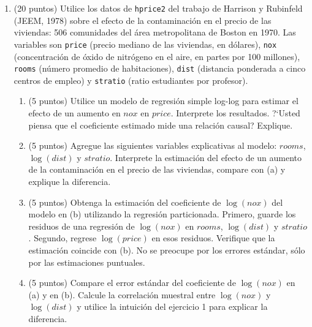 \documentclass[letterpaper,11pt]{article}
\theoremstyle{plain}
\theoremstyle{definition}
\theoremstyle{remark}
\begin{document}
\begin{enumerate}
    \item (20 puntos) Utilice los datos de \texttt{hprice2} del trabajo de Harrison y
        Rubinfeld (JEEM, 1978) sobre el efecto de la contaminaci\'on en el precio de las
        viviendas: 506 comunidades del \'area metropolitana de Boston en 1970. Las variables son
        \texttt{price} (precio mediano de las viviendas, en d\'olares), \texttt{nox}
        (concentraci\'on de \'oxido de nitr\'ogeno en el aire, en partes por 100 millones),
        \texttt{rooms} (n\'umero promedio de habitaciones), \texttt{dist} (distancia ponderada
        a cinco centros de empleo) y \texttt{stratio} (ratio estudiantes por
        profesor).
        \begin{enumerate}
            \item (5 puntos) Utilice un modelo de regresi\'on simple log-log para estimar el
                efecto de un aumento en $nox$ en $price$. Interprete los resultados. ?`Usted
                piensa que el coeficiente estimado mide una relaci\'on causal? Explique.
            \item (5 puntos) Agregue las siguientes variables explicativas al modelo:
                $rooms$, $\log(dist)$ y $stratio$. Interprete la estimaci\'on del efecto de un
                aumento de la contaminaci\'on en el precio de las viviendas, compare con (a) y
                explique la diferencia.
            \item (5 puntos) Obtenga la estimaci\'on del coeficiente de $\log(nox)$ del modelo
                en (b) utilizando la regresi\'on particionada. Primero, guarde los residuos de una
                regresi\'on de $\log(nox)$ en $rooms$, $\log(dist)$ y $stratio$. Segundo, regrese
                $\log(price)$ en esos residuos. Verifique que la estimaci\'on coincide con (b).
                No se preocupe por los errores est\'andar, s\'olo por las estimaciones puntuales.
            \item (5 puntos) Compare el error est\'andar del coeficiente de $\log(nox)$ en (a) y
                en (b). Calcule la correlaci\'on muestral entre $\log(nox)$ y $\log(dist)$ y
                utilice la intuici\'on del ejercicio 1 para explicar la diferencia.
        \end{enumerate}

\end{enumerate}
\end{document}
